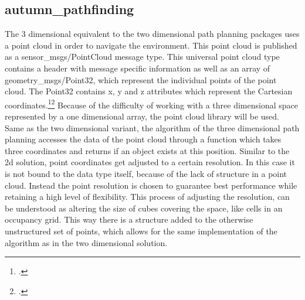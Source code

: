 \subsection{autumn\_pathfinding}
The 3 dimensional equivalent to the two dimensional path planning packages uses a point cloud in order to navigate the environment. This point cloud is published as a sensor\_msgs/PointCloud message type. This universal point cloud type contains a header with message specific information as well as an array of geometry\_msgs/Point32, which represent the individual points of the point cloud. The Point32 contains x, y and z attributes which represent the Cartesian coordinates.\footcite{rosGeometryMsgsPoint322021}\footcite{rosSensorMsgsPointCloud2021}\newline
Because of the difficulty of working with a three dimensional space represented by a one dimensional array, the point cloud library will be used. Same as the two dimensional variant, the algorithm of the three dimensional path planning accesses the data of the point cloud through a function which takes three coordinates and returns if an object exists at this position.\newline
Similar to the 2d solution, point coordinates get adjusted to a certain resolution. In this case it is not bound to the data type itself, because of the lack of structure in a point cloud. Instead the point resolution is chosen to guarantee best performance while retaining a high level of flexibility. This process of adjusting the resolution, can be understood as altering the size of cubes covering the space, like cells in an occupancy grid. This way there is a structure added to the otherwise unstructured set of points, which allows for the same implementation of the algorithm as in the two dimensional solution. 

